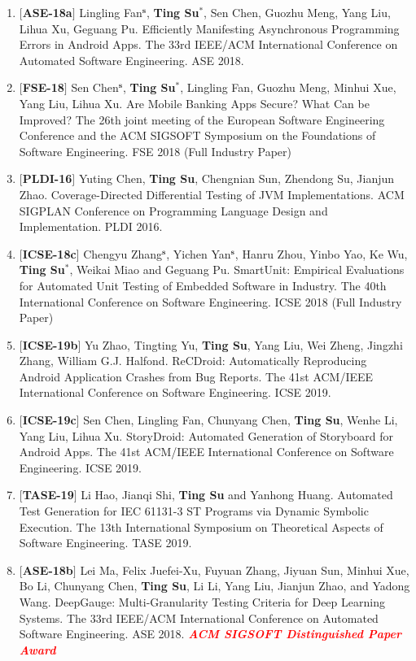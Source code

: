\documentclass[margin]{res}
\begin{document}
\begin{resume}
\begin{enumerate}[leftmargin=*]
    \item $[$\textbf{ASE-18a}$]$ Lingling Fan$^{\textbf{s}}$, \textbf{Ting Su$^{\textbf{*}}$}, Sen Chen, Guozhu Meng, Yang Liu, Lihua Xu, Geguang Pu. Efficiently Manifesting Asynchronous Programming Errors in Android Apps. The 33rd IEEE/ACM International Conference on Automated Software Engineering. ASE 2018.
    \item $[$\textbf{FSE-18}$]$ Sen Chen$^{\textbf{s}}$, \textbf{Ting Su$^{\textbf{*}}$}, Lingling Fan, Guozhu Meng, Minhui Xue, Yang Liu, Lihua Xu. Are Mobile Banking Apps Secure? What Can be Improved? The 26th joint meeting of the European Software Engineering Conference and the ACM SIGSOFT Symposium on the Foundations of Software Engineering. FSE 2018 (Full Industry Paper)
    \item $[$\textbf{PLDI-16}$]$ Yuting Chen, \textbf{Ting Su}, Chengnian Sun, Zhendong Su, Jianjun Zhao. Coverage-Directed Differential Testing of JVM Implementations. ACM SIGPLAN Conference on Programming Language Design and Implementation. PLDI 2016.
    \item $[$\textbf{ICSE-18c}$]$ Chengyu Zhang$^{\textbf{s}}$, Yichen Yan$^{\textbf{s}}$, Hanru Zhou, Yinbo Yao, Ke Wu, \textbf{Ting Su$^{\textbf{*}}$}, Weikai Miao and Geguang Pu. SmartUnit: Empirical Evaluations for Automated Unit Testing of Embedded Software in Industry. The 40th International Conference on Software Engineering. ICSE 2018 (Full Industry Paper)
    \item $[$\textbf{ICSE-19b}$]$ Yu Zhao, Tingting Yu, \textbf{Ting Su}, Yang Liu, Wei Zheng, Jingzhi Zhang, William G.J. Halfond. ReCDroid: Automatically Reproducing Android Application Crashes from Bug Reports. The 41st ACM/IEEE International Conference on Software Engineering. ICSE 2019. 
    \item $[$\textbf{ICSE-19c}$]$ Sen Chen, Lingling Fan, Chunyang Chen, \textbf{Ting Su}, Wenhe Li, Yang Liu, Lihua Xu. StoryDroid: Automated Generation of Storyboard for Android Apps. The 41st ACM/IEEE International Conference on Software Engineering. ICSE 2019. 
    \item $[$\textbf{TASE-19}$]$ Li Hao, Jianqi Shi, \textbf{Ting Su} and Yanhong Huang. Automated Test Generation for IEC 61131-3 ST Programs via Dynamic Symbolic Execution. The 13th International Symposium on Theoretical Aspects of Software Engineering. TASE 2019.
    \item $[$\textbf{ASE-18b}$]$ Lei Ma, Felix Juefei-Xu, Fuyuan Zhang, Jiyuan Sun, Minhui Xue, Bo Li, Chunyang Chen, \textbf{Ting Su}, Li Li, Yang Liu, Jianjun Zhao, and Yadong Wang. DeepGauge: Multi-Granularity Testing Criteria for Deep Learning Systems. The 33rd IEEE/ACM International Conference on Automated Software Engineering. ASE 2018. \textbf{\emph{\textcolor{red}{ACM SIGSOFT Distinguished Paper Award}}}

\end{enumerate}
\end{resume}
\end{document}
